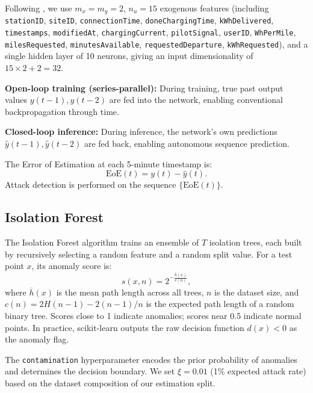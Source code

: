 \documentclass[journal]{IEEEtran}
\newcommand{\yhat}{\hat{y}}
\newcommand{\eoe}{\mathrm{EoE}}
\begin{document}
Following \cite{basumatary2025}, we use $m_x = m_y = 2$, $n_u = 15$
exogenous features (including \texttt{stationID}, \texttt{siteID},
\texttt{connectionTime}, \texttt{doneChargingTime}, \texttt{kWhDelivered},
\texttt{timestamps}, \texttt{modifiedAt}, \texttt{chargingCurrent},
\texttt{pilotSignal}, \texttt{userID}, \texttt{WhPerMile},
\texttt{milesRequested}, \texttt{minutesAvailable},
\texttt{requestedDeparture}, \texttt{kWhRequested}),
and a single hidden layer of 10 neurons, giving an input dimensionality
of $15 \times 2 + 2 = 32$.

\textbf{Open-loop training (series-parallel):} During training, true
past output values $y(t-1), y(t-2)$ are fed into the network,
enabling conventional backpropagation through time.

\textbf{Closed-loop inference:} During inference, the network's own
predictions $\yhat(t-1), \yhat(t-2)$ are fed back, enabling autonomous
sequence prediction.

The Error of Estimation at each 5-minute timestamp is:
\begin{equation}
\eoe(t) = y(t) - \yhat(t).
\label{eq:eoe}
\end{equation}
Attack detection is performed on the sequence $\{\eoe(t)\}$.

\subsection{Isolation Forest}

The Isolation Forest algorithm \cite{liu2008isolation} trains an
ensemble of $T$ isolation trees, each built by recursively selecting a
random feature and a random split value. For a test point $x$, its
anomaly score is:
\begin{equation}
s(x, n) = 2^{-\frac{\overline{h}(x)}{c(n)}},
\label{eq:ifscore}
\end{equation}
where $\overline{h}(x)$ is the mean path length across all trees, $n$
is the dataset size, and $c(n) = 2H(n-1) - 2(n-1)/n$ is the expected
path length of a random binary tree. Scores close to 1 indicate
anomalies; scores near 0.5 indicate normal points. In practice,
scikit-learn \cite{liu2008isolation} outputs the raw decision function
$d(x) < 0$ as the anomaly flag.

The \texttt{contamination} hyperparameter encodes the prior probability
of anomalies and determines the decision boundary. We set
$\xi = 0.01$ (1\% expected attack rate) based on the dataset composition
of our estimation split.
\end{document}
